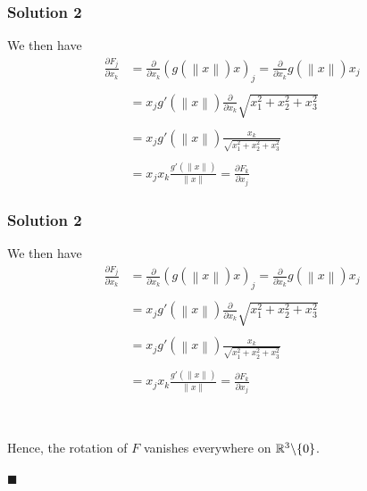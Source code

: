 \documentclass[10pt, t, allowdisplaybreaks]{beamer}
\newcommand{\myqed}{\hfill$\blacksquare$}
\newcommand{\nullspacesmall}{~\vspace{1em}}
\begin{document}
\begin{frame}
    \frametitle{Solution 2}
    We then have 
    \begin{equation*}
        \begin{split}
            \frac{\partial F_j}{\partial x_k} &= \frac{\partial}{\partial x_k}\left(g(\left\lVert x\right\rVert )x\right)_j
            = \frac{\partial}{\partial x_k}g(\left\lVert x\right\rVert )x_j\\\\
            &= x_j g'(\left\lVert x\right\rVert )\frac{\partial }{\partial x_k}\sqrt{x_1^2+x_2^2+x_3^2} \\\\
            &= x_j g'(\left\lVert x\right\rVert )\frac{x_k}{\sqrt{x_1^2+x_2^2+x_3^2}} \\\\
            &= x_j x_k \frac{g'(\left\lVert x\right\rVert )}{\left\lVert x\right\rVert } = \frac{\partial F_k}{\partial x_j}
        \end{split}
    \end{equation*}
\end{frame}
\begin{frame}
    \frametitle{Solution 2}
    We then have 
    \begin{equation*}
        \begin{split}
            \frac{\partial F_j}{\partial x_k} &= \frac{\partial}{\partial x_k}\left(g(\left\lVert x\right\rVert )x\right)_j
            = \frac{\partial}{\partial x_k}g(\left\lVert x\right\rVert )x_j\\\\
            &= x_j g'(\left\lVert x\right\rVert )\frac{\partial }{\partial x_k}\sqrt{x_1^2+x_2^2+x_3^2} \\\\
            &= x_j g'(\left\lVert x\right\rVert )\frac{x_k}{\sqrt{x_1^2+x_2^2+x_3^2}} \\\\
            &= x_j x_k \frac{g'(\left\lVert x\right\rVert )}{\left\lVert x\right\rVert } = \frac{\partial F_k}{\partial x_j}
        \end{split}
    \end{equation*}

    \nullspacesmall

    \par Hence, the rotation of $F$ vanishes everywhere on $\mathbb{R}^3\backslash\{0\}$.

    \myqed

\end{frame}
\end{document}
